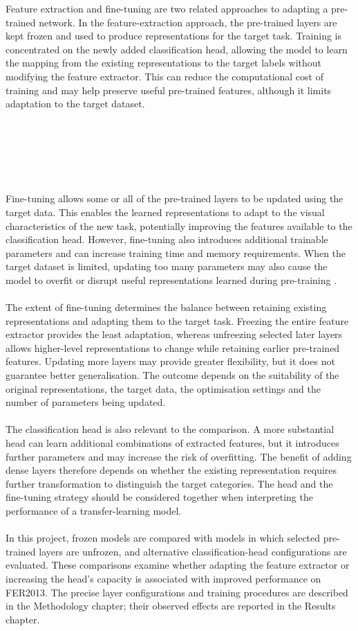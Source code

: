 \documentclass[12pt, a4paper]{report}
\begin{document}
				Feature extraction and fine-tuning are two related approaches to adapting a pre-trained network. In the feature-extraction approach, the pre-trained layers are kept frozen and used to produce representations for the target task. Training is concentrated on the newly added classification head, allowing the model to learn the mapping from the existing representations to the target labels without modifying the feature extractor. This can reduce the computational cost of training and may help preserve useful pre-trained features, although it limits adaptation to the target dataset.\\\\\\\\\\\\\\
				Fine-tuning allows some or all of the pre-trained layers to be updated using the target data. This enables the learned representations to adapt to the visual characteristics of the new task, potentially improving the features available to the classification head. However, fine-tuning also introduces additional trainable parameters and can increase training time and memory requirements. When the target dataset is limited, updating too many parameters may also cause the model to overfit or disrupt useful representations learned during pre-training \cite{Pan2010TransferLearning}.\\\\
				The extent of fine-tuning determines the balance between retaining existing representations and adapting them to the target task. Freezing the entire feature extractor provides the least adaptation, whereas unfreezing selected later layers allows higher-level representations to change while retaining earlier pre-trained features. Updating more layers may provide greater flexibility, but it does not guarantee better generalisation. The outcome depends on the suitability of the original representations, the target data, the optimisation settings and the number of parameters being updated.\\\\
				The classification head is also relevant to the comparison. A more substantial head can learn additional combinations of extracted features, but it introduces further parameters and may increase the risk of overfitting. The benefit of adding dense layers therefore depends on whether the existing representation requires further transformation to distinguish the target categories. The head and the fine-tuning strategy should be considered together when interpreting the performance of a transfer-learning model.\\\\
				In this project, frozen models are compared with models in which selected pre-trained layers are unfrozen, and alternative classification-head configurations are evaluated. These comparisons examine whether adapting the feature extractor or increasing the head's capacity is associated with improved performance on FER2013. The precise layer configurations and training procedures are described in the Methodology chapter; their observed effects are reported in the Results chapter.
				
\end{document}
